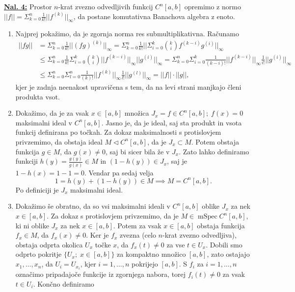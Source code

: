 \documentclass[a4paper, 12pt]{article}
\DeclareMathOperator{\mSpec}{mSpec}
\newcommand{\subideal}{\vartriangleleft}
\begin{document}
\underline{\textbf{Nal. 4:}}
Prostor $n$-krat zvezno odvedljivih funkcij $C^n[a,b]$ opremimo z normo $|| f || = \Sigma_{k=0}^n \frac{1}{k!}|| f^{(k)} ||_\infty$, da postane komutativna Banachova algebra z enoto.
\begin{enumerate}[label=(\alph*)]
	\item Najprej pokažimo, da je zgornja norma res submultiplikativna. Računamo
	\begin{align*}
	|| fg || &= \Sigma_{k=0}^n \frac{1}{k!} || (fg)^{(k)} ||_\infty = \Sigma_{k=0}^n \frac{1}{k!} || \Sigma_{i=0}^k \binom{k}{i} f^{(k-i)} g^{(i)} ||_\infty \\
	&\leq \Sigma_{k=0}^n \frac{1}{k!} \Sigma_{i=0}^k \binom{k}{i} || f^{(k-i)}||_\infty || g^{(i)} ||_\infty = \Sigma_{k=0}^n \Sigma_{i=0}^k \frac{1}{(k-i)!} || f^{(k-i)}||_\infty \frac{1}{i!} || g^{(i)} ||_\infty \\
	&\leq \Sigma_{k=0}^n \Sigma_{l=0}^n \frac{1}{(k)!} || f^{(k)}||_\infty \frac{1}{l!} || g^{(l)} ||_\infty = || f || \cdot || g ||,
	\end{align*}
	kjer je zadnja neenakost upravičena s tem, da na levi strani manjkajo členi produkta vsot.
	\item Dokažimo, da je za vsak $x \in [a, b]$ množica $J_x = {f \in C^n[a, b] ;\; f(x) = 0}$ maksimalni ideal v $C^n[a, b]$. Jasno je, da je ideal, saj sta produkt in vsota funkcij definirana po točkah. Za dokaz maksimalnosti s protislovjem privzemimo, da obstaja ideal $M \subideal C^n[a, b]$, da je $J_x \subset M$. Potem obstaja funkcija $g \in M$, da $g(x) \neq 0$, saj bi sicer bila že v $J_x$. Zato lahko definiramo funkciji $h(y) = \frac{g(y)}{g(x)} \in M$ in $(1 - h(y)) \in J_x$, saj je $1 - h(x) = 1 - 1 = 0$. Vendar pa sedaj velja
	\[
	1 = h(y) + (1 - h(y)) \in M \implies M = C^n[a, b].
	\]
	Po definiciji je $J_x$ maksimalni ideal.
	\item Dokažimo še obratno, da so vsi maksimalni ideali v $C^n[a, b]$ oblike $J_x$ za nek $x \in [a, b]$.
	Za dokaz s protislovjem privzemimo, da je $M \in \mSpec C^n[a, b]$, ki ni oblike $J_x$ za nek $x \in [a, b]$. Potem za vsak $x \in [a, b]$ obstaja funkcija $f_x \in M$, da $f_x(x) \neq 0$. Ker je $f_x$ zvezna (celo $n$-krat zvezno odvedljiva), obstaja odprta okolica $U_x$ točke $x$, da $f_x(t) \neq 0$ za vse $t \in U_x$. Dobili smo odprto pokritje $\lbrace U_x ;\; x \in [a, b] \rbrace$ za kompaktno množico $[a, b]$, zato ostajajo $x_1, \dots, x_n$, da $U_i = U_{x_i}$, kjer $i = 1, \dots, n$ pokrijejo $[a, b]$. S $f_i$ za $i = 1, \dots, n$ označimo pripadajoče funkcije iz zgornjega nabora, torej $f_i(t) \neq 0$ za vsak $t \in U_i$. Končno definiramo

\end{enumerate}
\end{document}

